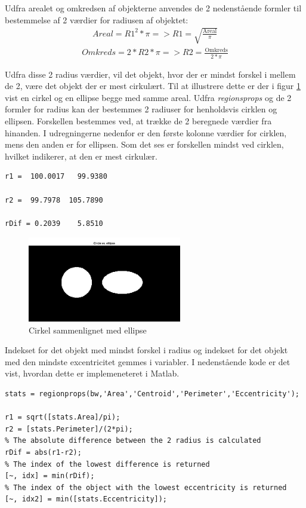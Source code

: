 Udfra arealet og omkredsen af objekterne anvendes de 2 nedenstående formler til bestemmelse af 2 værdier for radiusen af objektet:
\begin{align}
Areal = R1^2*\pi => R1 = \sqrt{\frac{\text{Areal}}{\pi}}
\end{align}
\begin{align}
Omkreds = 2*R2*\pi => R2 = \frac{\text{Omkreds}}{2*\pi}
\end{align}

Udfra disse 2 radius værdier, vil det objekt, hvor der er mindst forskel i mellem de 2, være det objekt der er mest cirkulært. Til at illustrere dette er der i figur \ref{fig:circleelip} vist en cirkel og en ellipse begge med samme areal. Udfra \textit{regionsprops} og de 2 formler for radius kan der bestemmes 2 radiuser for henholdsvis cirklen og ellipsen. Forskellen bestemmes ved, at trække de 2 beregnede værdier fra hinanden. I udregningerne nedenfor er den første kolonne værdier for cirklen, mens den anden er for ellipsen. Som det ses er forskellen mindst ved cirklen, hvilket indikerer, at den er mest cirkulær.
  
\begin{lstlisting} 
r1 =  100.0017   99.9380

r2 =  99.7978  105.7890

rDif = 0.2039    5.8510
\end{lstlisting} 

\begin{figure}[H]
	\centering
	\includegraphics[width=0.6\textwidth]{billeder/software/circleellipse.png}
	\caption{Cirkel sammenlignet med ellipse}
	\label{fig:circleelip}
\end{figure}

Indekset for det objekt med mindst forskel i radius og indekset for det objekt med den mindste excentricitet gemmes i variabler. I nedenstående kode er det vist, hvordan dette er implemeneteret i Matlab.

\begin{lstlisting} 
stats = regionprops(bw,'Area','Centroid','Perimeter','Eccentricity');

r1 = sqrt([stats.Area]/pi);
r2 = [stats.Perimeter]/(2*pi);
% The absolute difference between the 2 radius is calculated
rDif = abs(r1-r2);
% The index of the lowest difference is returned
[~, idx] = min(rDif);
% The index of the object with the lowest eccentricity is returned 
[~, idx2] = min([stats.Eccentricity]);
\end{lstlisting} 

